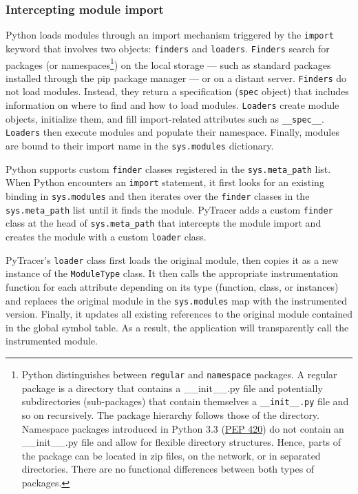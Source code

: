\documentclass[11pt]{article}
\newcommand{\pytracer}[0]{PyTracer\xspace}
\begin{document}
\subsubsection{Intercepting module import}

Python loads modules through an import mechanism triggered by the \texttt{import} keyword that involves two objects: \texttt{finders} and \texttt{loaders}. \texttt{Finders} search for packages (or 
namespaces\footnote{Python distinguishes between \texttt{regular} and \texttt{namespace} packages.
A regular package is a directory that contains a \_\_init\_\_.py file and potentially subdirectories (sub-packages) 
that contain themselves a \texttt{\_\_init\_\_.py} file and so on recursively. 
The package hierarchy follows those of the directory. 
Namespace packages introduced in Python 3.3 (\href{https://www.python.org/dev/peps/pep-0420/}{PEP 420}) do not contain an
\_\_init\_\_.py file and allow for flexible directory structures. Hence, parts of the package can be located in zip files, on the network, or in separated directories. There are no functional differences between both types of packages.}) on the local storage --- such as standard packages installed through the pip package manager --- or on a distant server.
\texttt{Finders} do not load modules. Instead, they return a specification (\texttt{spec} object) that includes 
information on where to find and how to load modules.
\texttt{Loaders} create module objects, initialize them, and fill import-related attributes 
such as \texttt{\_\_spec\_\_}. 
\texttt{Loaders} then execute modules and populate their namespace. Finally, modules are bound to their import name in the \texttt{sys.modules} dictionary.


Python supports custom \texttt{finder} classes registered in the \texttt{sys.meta\_path} list.
When Python encounters an \texttt{import} statement, it first looks for an existing binding in \texttt{sys.modules} and then iterates over the \texttt{finder} classes in the \texttt{sys.meta\_path} list until it finds the module. \pytracer adds a custom \texttt{finder} class at the head of \texttt{sys.meta\_path} that intercepts
the module import and creates the module with a custom \texttt{loader} class.

\pytracer's \texttt{loader} class first loads the original module, then copies it as a new instance of the \texttt{ModuleType} class. It then calls the appropriate instrumentation function for each attribute depending on its type (function, class, or instances) and replaces the original module in the \texttt{sys.modules} map with the instrumented version. Finally, it updates all existing references to the original module contained in the global symbol table.
As a result, the application will transparently call the instrumented module.
\end{document}
